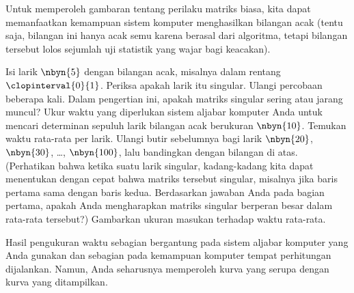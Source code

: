 \begin{exercises}
  \item 
    Untuk memperoleh gambaran tentang perilaku matriks biasa, kita dapat
    memanfaatkan kemampuan sistem komputer menghasilkan bilangan acak (tentu
    saja, bilangan ini hanya acak semu karena berasal dari algoritma, tetapi
    bilangan tersebut lolos sejumlah uji statistik yang wajar bagi keacakan).
    \begin{exparts}
      \partsitem Isi larik $\nbyn{5}$ dengan bilangan acak, misalnya dalam
        rentang $\clopinterval{0}{1}$.
        Periksa apakah larik itu singular. Ulangi percobaan beberapa kali.
        Dalam pengertian ini, apakah matriks singular sering atau jarang muncul?
      \partsitem Ukur waktu yang diperlukan sistem aljabar komputer Anda untuk
        mencari determinan sepuluh larik bilangan acak berukuran $\nbyn{10}$.
        Temukan waktu rata-rata per larik.
        Ulangi butir sebelumnya bagi larik $\nbyn{20}$, $\nbyn{30}$, \ldots,
        $\nbyn{100}$, lalu bandingkan dengan bilangan di atas.
        (Perhatikan bahwa ketika suatu larik singular, kadang-kadang kita dapat
        menentukan dengan cepat bahwa matriks tersebut singular, misalnya jika
        baris pertama sama dengan baris kedua. Berdasarkan jawaban Anda pada
        bagian pertama, apakah Anda mengharapkan matriks singular berperan besar
        dalam rata-rata tersebut?)
      \partsitem Gambarkan ukuran masukan terhadap waktu rata-rata.
    \end{exparts}
    \begin{answer}
      Hasil pengukuran waktu sebagian bergantung pada sistem aljabar komputer
      yang Anda gunakan dan sebagian pada kemampuan komputer tempat perhitungan
      dijalankan. Namun, Anda seharusnya memperoleh kurva yang serupa dengan
      kurva yang ditampilkan.


\end{answer}
\end{exercises}
